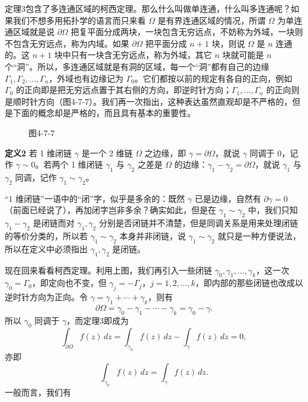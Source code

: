 定理3包含了多连通区域的柯西定理。那么什么叫做单连通，什么叫多连通呢？如果我们不想多用拓扑学的语言而只来看 $\Omega$ 是有界连通区域的情况，所谓 $\Omega$ 为单连通区域就是说 $\partial\Omega$ 把复平面分成两块，一块包含无穷远点，不妨称为外域，一块则不包含无穷远点，称为内域。如果 $\partial\Omega$ 把平面分成 $n+1$ 块，则说 $\Omega$ 是 $n$ 连通的。这 $n+1$ 块中只有一块含无穷远点，称为外域，其它 $n$ 块就可能是 $n$ 个“洞”。所以，多连通区域就是有洞的区域，每一个“洞”都有自己的边缘 $\Gamma_1,\Gamma_2,\ldots,\Gamma_n$，外域也有边缘记为 $\Gamma_0$。它们都按以前的规定有各自的正向，例如 $\Gamma_0$ 的正向即是把无穷远点置于其右侧的方向，即逆时针方向；$\Gamma_1,\ldots,\Gamma_n$ 的正向则是顺时针方向（图4-7-7）。我们再一次指出，这种表达虽然直观却是不严格的，但是下面的概念却是严格的，而且具有基本的重要性。

\begin{figure}[htbp]
\centering
{}
\caption*{图4-7-7}
\end{figure}

\noindent\textbf{定义2}
若 1 维闭链 $\gamma$ 是一个 2 维链 $\Omega$ 之边缘，即 $\gamma=\partial\Omega$，就说 $\gamma$ 同调于 0，记作 $\gamma\sim0$。若两个 1 维闭链 $\gamma_1$ 与 $\gamma_2$ 之差是 $\Omega$ 的边缘：$\gamma_1-\gamma_2=\partial\Omega$，就说 $\gamma_1$ 与 $\gamma_2$ 同调，记作 $\gamma_1\sim\gamma_2$。

“1 维闭链”一语中的“闭”字，似乎是多余的：既然 $\gamma$ 已是边缘，自然有 $\partial\gamma=0$（前面已经说了），再加闭字岂非多余？确实如此，但是在 $\gamma_1\sim\gamma_2$ 中，我们只知 $\gamma_1-\gamma_2$ 是闭链而对 $\gamma_1,\gamma_2$ 分别是否闭链并不清楚，但是同调关系是用来处理闭链的等价分类的，所以若 $\gamma_1\sim\gamma_2$ 本身并非闭链，说 $\gamma_1\sim\gamma_2$ 就只是一种方便说法，所以在定义中必须指出 $\gamma_1,\gamma_2$ 是闭链。

现在回来看看柯西定理。利用上图，我们再引入一些闭链 $\gamma_0,\gamma_1,\ldots,\gamma_k$，这一次 $\gamma_0=\Gamma_0$，即定向也不变，但 $\gamma_j=-\Gamma_j$，$j=1,2,\ldots,k$，即内部的那些闭链也改成以逆时针方向为正向。令 $\gamma=\gamma_1+\cdots+\gamma_k$，则有
\[
 \partial\Omega=\gamma_0-\gamma_1-\cdots-\gamma_k=\gamma_0-\gamma.
\]
所以 $\gamma_0$ 同调于 $\gamma$，而定理3即成为
\[
 \int_{\partial\Omega}f(z)\,dz
 =\int_{\gamma_0}f(z)\,dz-
 \int_\gamma f(z)\,dz=0,
\]
亦即
\[
 \int_{\gamma_0}f(z)\,dz=\int_\gamma f(z)\,dz.
\]
一般而言，我们有

